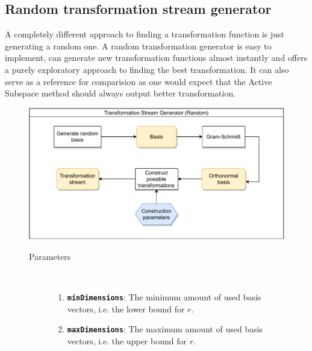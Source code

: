 \documentclass[
  a4paper,  %
  twoside,  %
  bibliography=totoc,
  headsepline,
  cleardoublepage=empty,
  parskip=half,
  draft=false
]{scrbook}
\begin{document}
\subsection {Random transformation stream generator}

A completely different approach to finding a transformation function is just generating a random one.
A random transformation generator is easy to implement, can generate new transformation functions almost instantly and offers a purely exploratory approach to finding the best transformation.
It can also serve as a reference for comparision as one would expect that the Active Subspace method should always output better transformation.

\begin{figure}[H]

\includegraphics[width=\textwidth]{graphics/TransformationStreamGen_Random.pdf}

\vspace{-1.5mm}

\begin{mdframed}[linewidth=0.7px]

\begin{description}
\item[Parameters] {~ \begin{enumerate}[\indent{}]
\item \texttt{\textbf{minDimensions}}: The minimum amount of used basis vectors, i.e. the lower bound for $r$.
\item \texttt{\textbf{maxDimensions}}: The maximum amount of used basis vectors, i.e. the upper bound for $r$.
\end{enumerate}}
\end{description}

\end{mdframed}
\label{fig:rtsg}
\end{figure}
\end{document}
